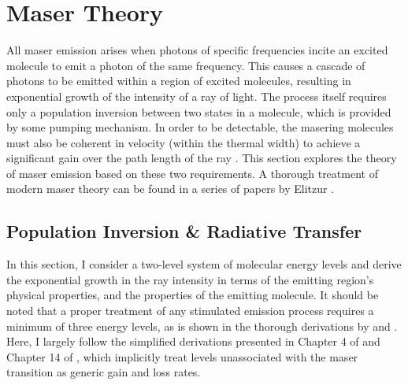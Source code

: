 \section{Maser Theory}
\label{sec:maser_theory}

All maser emission arises when photons of specific frequencies incite an excited molecule to emit a photon of the same frequency.  This causes a cascade of photons to be emitted within a region of excited molecules, resulting in exponential growth of the intensity of a ray of light.  The process itself requires only a population inversion between two states in a molecule, which is provided by some pumping mechanism.  In order to be detectable, the masering molecules must also be coherent in velocity (within the thermal width) to achieve a significant gain over the path length of the ray \citep{lo2005}.  This section explores the theory of maser emission based on these two requirements.  A thorough treatment of modern maser theory can be found in a series of papers by Elitzur \citep{Elitzur_1990,Elitzur_1990_paperI,Elitzur_1990_paperII,Elitzur_1991}.

\subsection{Population Inversion \& Radiative Transfer}
\label{sub:pop_inverse_rad_trans}

In this section, I consider a two-level system of molecular energy levels and derive the exponential growth in the ray intensity in terms of the emitting region's physical properties, and the properties of the emitting molecule. It should be noted that a proper treatment of any stimulated emission process requires a minimum of three energy levels, as is shown in the thorough derivations by \cite{Elitzur_1992} and \cite{Gray_2009}. Here, I largely follow the simplified derivations presented in Chapter 4 of \cite{elitzur1992_text} and Chapter 14 of \citet{stahler_palla_2004}, which implicitly treat levels unassociated with the maser transition as generic gain and loss rates.


